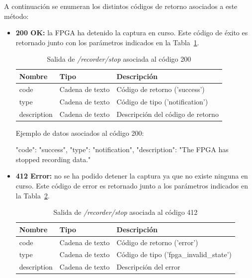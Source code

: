 A continuación se enumeran los distintos códigos de retorno asociados a este método:
\begin{itemize}

\item{\textbf{200 OK:} la \gls{FPGA} ha detenido la captura en curso.
Este código de éxito es retornado junto con los parámetros indicados en la Tabla~\ref{extra:api:recorderstop:ok}.
\begin{table}[H]
\centering
\begin{tabular}{|l|l|l|}
\hline
\rowcolor[HTML]{F5F5F5}
\textbf{Nombre}  & \textbf{Tipo}   & \textbf{Descripción}              \\ \hline
code             & Cadena de texto & Código de retorno ('success')     \\ \hline
type             & Cadena de texto & Código de tipo ('notification')   \\ \hline
description      & Cadena de texto & Descripción del código de retorno \\ \hline
\end{tabular}
\caption{Salida de \textit{/recorder/stop} asociada al código 200}
\label{extra:api:recorderstop:ok}
\end{table}
\begin{minipage}{\textwidth}
Ejemplo de datos asociados al código 200:

\begin{code}[language=json]
{
  "code": "success",
  "type": "notification",
  "description": "The FPGA has stopped recording data."
}
\end{code}
\end{minipage}
}

\item{\textbf{412 Error:} no se ha podido detener la captura ya que no existe ninguna en curso.
Este código de error es retornado junto a los parámetros indicados en la Tabla~\ref{extra:api:recorderstop:error}.
\begin{table}[H]
\centering
\begin{tabular}{|l|l|l|}
\hline
\rowcolor[HTML]{F5F5F5}
\textbf{Nombre}  & \textbf{Tipo}   & \textbf{Descripción}                    \\ \hline
code             & Cadena de texto & Código de retorno ('error')             \\ \hline
type             & Cadena de texto & Código de tipo ('fpga\_invalid\_state') \\ \hline
description      & Cadena de texto & Descripción del error                   \\ \hline
\end{tabular}
\caption{Salida de \textit{/recorder/stop} asociada al código 412}
\label{extra:api:recorderstop:error}
\end{table}

}
\end{itemize}
